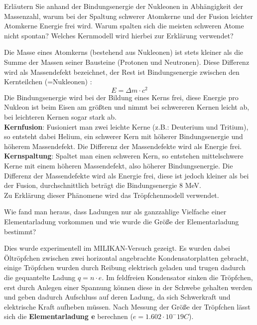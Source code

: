\documentclass[12pt,a4paper,ngerman]{article}
\begin{document}
\pagebreak

\begin{framed}
Erläutern Sie anhand der Bindungsenergie der Nukleonen in Abhängigkeit der Massenzahl, warum bei der Spaltung schwerer Atomkerne und der Fusion leichter Atomkerne Energie frei wird. Warum spalten sich die meisten schweren Atome nicht spontan? Welches Kernmodell wird hierbei zur Erklärung verwendet?
\end{framed}


Die Masse eines Atomkerns (bestehend aus Nukleonen) ist stets kleiner als die Summe der Massen seiner Bausteine (Protonen und Neutronen). Diese Differenz wird als Massendefekt bezeichnet, der Rest ist Bindungsenergie zwischen den Kernteilchen (=Nukleonen) :
\begin{equation*}
E = \Delta m \cdot c^2
\end{equation*}
Die Bindungsenergie wird bei der Bildung eines Kerns frei, diese Energie pro Nukleon ist beim Eisen am größten und nimmt bei schwereren Kernen leicht ab, bei leichteren Kernen sogar stark ab. \\
\textbf{Kernfusion}: Fusioniert man zwei leichte Kerne (z.B.: Deuterium und Tritium), so entsteht dabei Helium, ein schwerer Kern mit höherer Bindungsenergie und höherem Massendefekt. Die Differenz der Massendefekte wird als Energie frei. 
\\
\textbf{Kernspaltung}: Spaltet man einen schweren Kern, so entstehen mittelschwere Kerne mit einem höheren Massendefekt, also höherer Bindungsenergie. Die Differenz der Massendefekte wird als Energie frei, diese ist jedoch kleiner als bei der Fusion, durchschnittlich beträgt die Bindungsenergie 8 MeV. 
\\
Zu Erklärung dieser Phänomene wird das Tröpfchenmodell verwendet.


\begin{framed}
Wie fand man heraus, dass Ladungen nur als ganzzahlige Vielfache einer Elementarladung vorkommen und wie wurde die Größe der Elementarladung bestimmt?
\end{framed}

Dies wurde experimentell im MILIKAN-Versuch gezeigt.
Es wurden dabei Öltröpfchen zwischen zwei horizontal angebrachte Kondensatorplatten gebracht, einige Tröpfchen wurden durch Reibung elektrisch geladen und trugen dadurch die gequantelte Ladung $q = n \cdot e$. Im feldfreien Kondensator sinken die Tröpfchen, erst durch Anlegen einer Spannung können diese in der Schwebe gehalten werden und geben dadurch Aufschluss auf deren Ladung, da sich Schwerkraft und elektrische Kraft aufheben müssen. 
Nach Messung der Größe der Tröpfchen lässt sich die \textbf{Elementarladung e} berechnen ($e = 1.602\cdot 10^-19 C$).
\end{document}
